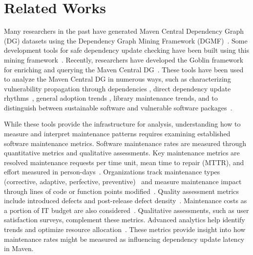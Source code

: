 \documentclass[conference]{IEEEtran}
\begin{document}
\section{Related Works} \label{sec: lit review}
Many researchers in the past have generated Maven Central Dependency Graph (DG) datasets using the Dependency Graph Mining Framework (DGMF)~\cite{MavenDependGraph,MavenRepoDataset,DGMF}. Some development tools for safe dependency update checking have been built using this mining framework~\cite{UpCy}. Recently, researchers have developed the Goblin framework for enriching and querying the Maven Central DG~\cite{jaime_goblin_2024}\cite{Goblin}.
These tools have been used to analyze the Maven Central DG in numerous ways, such as
characterizing vulnerability propagation through dependencies \cite{wu_yu_2013},
direct dependency update rhythms~\cite{jaime_goblin_2024},
general adoption trends \cite{kula_gaikovina_2018},
library maintenance trends,
and to distinguish between sustainable software and vulnerable software packages~\cite{MavenRepoDataset}. 

While these tools provide the infrastructure for analysis, understanding how to measure and interpret maintenance patterns requires examining established software maintenance metrics. Software maintenance rates are measured through quantitative metrics and qualitative assessments. Key maintenance metrics are resolved maintenance requests per time unit, mean time to repair (MTTR), and effort measured in person-days~\cite{sneed_measuring_1997}. Organizations track maintenance types (corrective, adaptive, perfective, preventive)~\cite{fasolino_metrics_2000} and measure maintenance impact through lines of code or function points modified~\cite{henry_defining_1996}. Quality assessment metrics include introduced defects and post-release defect density~\cite{fasolino_metrics_2000}. Maintenance costs as a portion of IT budget are also considered~\cite{sneed_measuring_1997}. Qualitative assessments, such as user satisfaction surveys, complement these metrics. Advanced analytics help identify trends and optimize resource allocation~\cite{henry_defining_1996}. These metrics provide insight into how maintenance rates might be measured as influencing dependency update latency in Maven.
\end{document}
